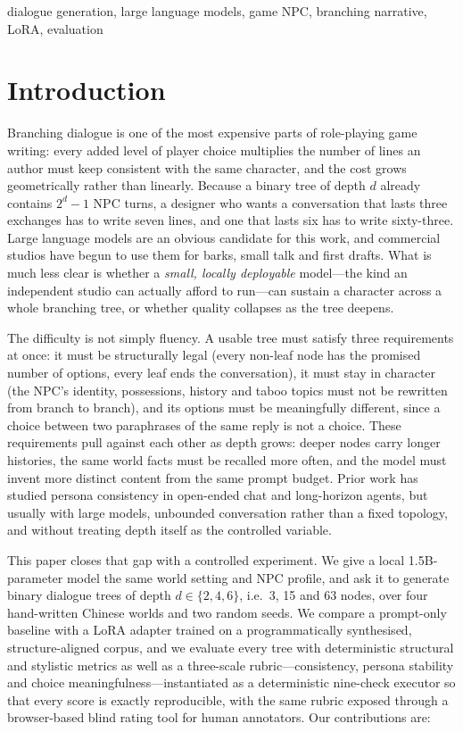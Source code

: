 \documentclass[conference]{IEEEtran}
\begin{document}
\begin{IEEEkeywords}
dialogue generation, large language models, game NPC, branching narrative, LoRA, evaluation
\end{IEEEkeywords}

\section{Introduction}
Branching dialogue is one of the most expensive parts of role-playing game writing: every added
level of player choice multiplies the number of lines an author must keep consistent with the same
character, and the cost grows geometrically rather than linearly. Because a binary tree of depth
$d$ already contains $2^{d}-1$ NPC turns, a designer who wants a conversation that lasts three
exchanges has to write seven lines, and one that lasts six has to write sixty-three. Large language
models are an obvious candidate for this work, and commercial studios have begun to use them for
barks, small talk and first drafts. What is much less clear is whether a \emph{small, locally
deployable} model---the kind an independent studio can actually afford to run---can sustain a
character across a whole branching tree, or whether quality collapses as the tree deepens.

The difficulty is not simply fluency. A usable tree must satisfy three requirements at once: it must
be structurally legal (every non-leaf node has the promised number of options, every leaf ends the
conversation), it must stay in character (the NPC's identity, possessions, history and taboo topics
must not be rewritten from branch to branch), and its options must be meaningfully different, since
a choice between two paraphrases of the same reply is not a choice. These requirements pull against
each other as depth grows: deeper nodes carry longer histories, the same world facts must be
recalled more often, and the model must invent more distinct content from the same prompt budget.
Prior work has studied persona consistency in open-ended chat and long-horizon agents, but usually
with large models, unbounded conversation rather than a fixed topology, and without treating depth
itself as the controlled variable.

This paper closes that gap with a controlled experiment. We give a local 1.5B-parameter model the
same world setting and NPC profile, and ask it to generate binary dialogue trees of depth
$d\in\{2,4,6\}$, i.e.\ 3, 15 and 63 nodes, over four hand-written Chinese worlds and two random
seeds. We compare a prompt-only baseline with a LoRA adapter trained on a programmatically
synthesised, structure-aligned corpus, and we evaluate every tree with deterministic structural and
stylistic metrics as well as a three-scale rubric---consistency, persona stability and choice
meaningfulness---instantiated as a deterministic nine-check executor so that every score is exactly
reproducible, with the same rubric exposed through a browser-based blind rating tool for human
annotators. Our contributions are:
\end{document}
